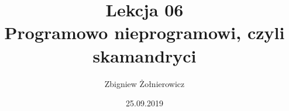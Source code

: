 \documentclass[a4paper]{article}
\begin{document}
\title{{\huge Lekcja 06} \\
{\large Programowo nieprogramowi, czyli skamandryci}}
\author{Zbigniew Żołnierowicz}
\date{25.09.2019}
\maketitle
\end{document}
